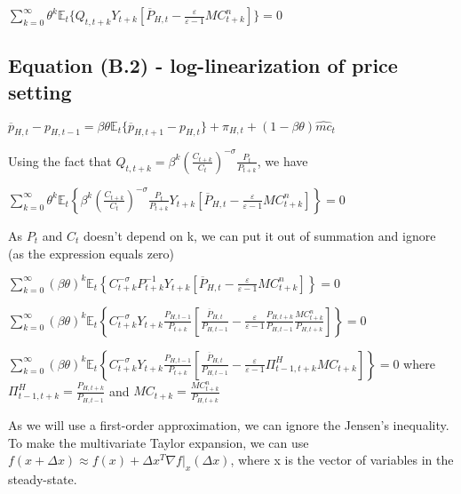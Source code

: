 \documentclass[
]{article}
\begin{document}
\(\displaystyle \sum_{k=0}^\infty \theta^k\mathbb{E}_t \bigg\{ Q_{t,t+k} Y_{t+k } \left[ \overline{P}_{H,t}-\frac{\varepsilon}{\varepsilon-1} MC_{t+k}^n \right] \bigg\} = 0\)

\vspace{12pt}

\hypertarget{equation-b.2---log-linearization-of-price-setting}{%
\subsection{Equation (B.2) - log-linearization of price
setting}\label{equation-b.2---log-linearization-of-price-setting}}

\(\overline{p}_{H,t}-p_{H,t-1}=\beta \theta \mathbb{E}_t \{ \overline{p}_{H,t+1}-p_{H,t}\} + \pi_{H,t}+(1-\beta \theta)\widehat{mc}_t\)

\vspace{8pt}

Using the fact that
\(\displaystyle Q_{t,t+k}=\beta^k \left( \frac{C_{t+k}}{C_t} \right)^{-\sigma}\frac{P_t}{P_{t+k}}\),
we have

\(\displaystyle \sum_{k=0}^\infty \theta^k\mathbb{E}_t \left\{ \beta^k \left( \frac{C_{t+k}}{C_t} \right)^{-\sigma}\frac{P_t}{P_{t+k}} Y_{t+k } \left[ \overline{P}_{H,t}-\frac{\varepsilon}{\varepsilon-1} MC_{t+k}^n \right] \right\} = 0\)

As \(P_t\) and \(C_t\) doesn't depend on k, we can put it out of
summation and ignore (as the expression equals zero)

\(\displaystyle \sum_{k=0}^\infty (\beta \theta)^k\mathbb{E}_t \left\{ C_{t+k}^{-\sigma}P_{t+k}^{-1} Y_{t+k } \left[ \overline{P}_{H,t}-\frac{\varepsilon}{\varepsilon-1} MC_{t+k}^n \right] \right\} = 0\)

\(\displaystyle \sum_{k=0}^\infty (\beta \theta)^k\mathbb{E}_t \left\{ C_{t+k}^{-\sigma} Y_{t+k } \frac{P_{H,t-1}}{P_{t+k}} \left[ \frac{\overline{P}_{H,t}}{P_{H,t-1}}-\frac{\varepsilon}{\varepsilon-1}\frac{P_{H,t+k}}{P_{H,t-1}} \frac{MC_{t+k}^n}{P_{H,t+k}} \right] \right\} = 0\)

\(\displaystyle \sum_{k=0}^\infty (\beta \theta)^k\mathbb{E}_t \left\{ C_{t+k}^{-\sigma} Y_{t+k } \frac{P_{H,t-1}}{P_{t+k}} \left[ \frac{\overline{P}_{H,t}}{P_{H,t-1}}-\frac{\varepsilon}{\varepsilon-1}\Pi_{t-1,t+k}^H MC_{t+k}\right] \right\} = 0\)
where \(\displaystyle \Pi_{t-1,t+k}^H = \frac{P_{H,t+k}}{P_{H,t-1}}\)
and \(\displaystyle MC_{t+k} = \frac{MC_{t+k}^n}{P_{H,t+k}}\)

As we will use a first-order approximation, we can ignore the Jensen's
inequality. To make the multivariate Taylor expansion, we can use
\(f(x+\Delta x) \approx f(x)+ \Delta x^T \nabla f|_x(\Delta x)\), where
x is the vector of variables in the steady-state.
\end{document}
